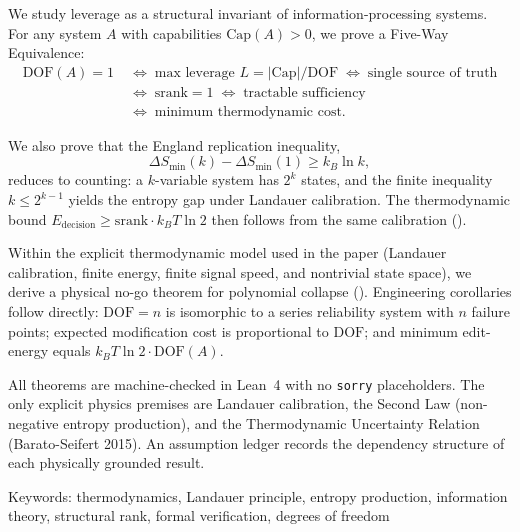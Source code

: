 We study leverage as a structural invariant of information-processing systems. For any system $A$ with capabilities $\mathrm{Cap}(A) > 0$, we prove a Five-Way Equivalence:
\[
\begin{aligned}
\mathrm{DOF}(A) = 1
&\;\iff\; \text{max leverage } L = |\mathrm{Cap}|/\mathrm{DOF}
\;\iff\; \text{single source of truth} \\
&\;\iff\; \mathrm{srank} = 1
\;\iff\; \text{tractable sufficiency} \\
&\;\iff\; \text{minimum thermodynamic cost}.
\end{aligned}
\]

We also prove that the England replication inequality,
\[
\Delta S_{\min}(k) - \Delta S_{\min}(1) \geq k_B \ln k,
\]
reduces to counting: a $k$-variable system has $2^k$ states, and the finite inequality $k \leq 2^{k-1}$ yields the entropy gap under Landauer calibration. The thermodynamic bound $E_{\mathrm{decision}} \geq \mathrm{srank} \cdot k_B T \ln 2$ then follows from the same calibration ().

Within the explicit thermodynamic model used in the paper (Landauer calibration, finite energy, finite signal speed, and nontrivial state space), we derive a physical no-go theorem for polynomial collapse (). Engineering corollaries follow directly: $\mathrm{DOF} = n$ is isomorphic to a series reliability system with $n$ failure points; expected modification cost is proportional to $\mathrm{DOF}$; and minimum edit-energy equals $k_B T \ln 2 \cdot \mathrm{DOF}(A)$.

All theorems are machine-checked in Lean~4 with no \texttt{sorry} placeholders. The only explicit physics premises are Landauer calibration, the Second Law (non-negative entropy production), and the Thermodynamic Uncertainty Relation (Barato-Seifert 2015). An assumption ledger records the dependency structure of each physically grounded result.

Keywords: thermodynamics, Landauer principle, entropy production, information theory, structural rank, formal verification, degrees of freedom
